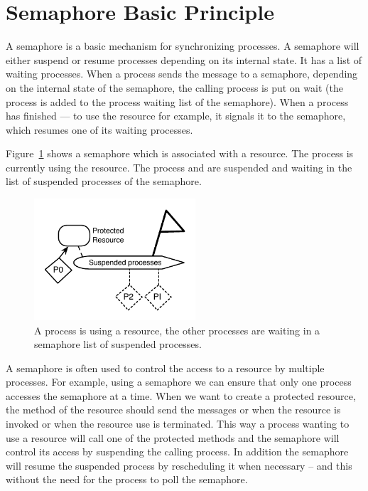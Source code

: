 \documentclass[a4paper,10pt,twoside]{book}
\begin{document}
\section{Semaphore Basic Principle}
A semaphore is a basic mechanism for synchronizing processes.  A semaphore will either suspend or resume processes depending on its internal state. It has a list of waiting processes. 
When a process sends the message  to a semaphore, depending on the internal state of the semaphore, the calling process is put on wait (the process is added to the process waiting list of the semaphore). When a process has finished --- to use the resource for example, it signals it to the semaphore, which resumes one of its waiting processes. 

Figure~\ref{fig:sema} shows a semaphore which is associated with a resource. The process  is currently using the resource. The process  and    are suspended and waiting in the list of suspended processes of the semaphore. 

\begin{figure}
\begin{center}
\includegraphics[width=6cm]{ASemaphoreAndProcesses}
\caption{ A process is using a resource, the other processes are waiting in a semaphore list of suspended processes. \label{fig:sema}}
\end{center}
\end{figure}

A semaphore is often used to control the access  to a resource by multiple processes. For example, using a semaphore we can ensure that only one process accesses the semaphore at a time. 
When we want to create a protected resource, the method of the resource should send the messages  or  when the resource is invoked or  when the resource use is terminated. 
This way a process wanting to use a resource will call one of the protected methods and the semaphore
will control its access by suspending the calling process. In addition the semaphore will resume the suspended 
process by rescheduling it when necessary -- and this without the need for the process to poll the semaphore.
\end{document}
